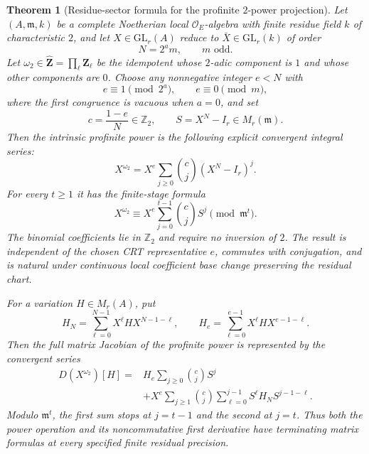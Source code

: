 \documentclass[11pt]{article}
\newtheorem{theorem}{Theorem}[section]
\theoremstyle{definition}
\begin{document}
\begin{theorem}[Residue-sector formula for the profinite $2$-power projection]
\label{thm:dyadic-omega2-power-formula}
Let $(A,\mathfrak m,k)$ be a complete Noetherian
local $\mathcal O_E$-algebra with finite residue
field $k$ of characteristic $2$, and let
$X\in\mathrm{GL}_r(A)$ reduce to
$\bar X\in\mathrm{GL}_r(k)$ of order
\[
 N=2^a m,\qquad m\text{ odd}.
\]
Let
$\omega_2\in\widehat{\mathbf Z}
=\prod_\ell\mathbf Z_\ell$ be the idempotent
whose $2$-adic component is $1$ and whose
other components are $0$.
Choose any nonnegative integer $e<N$ with
\begin{equation}\label{eq:dyadic-omega2-CRT}
 e\equiv1\pmod{2^a},\qquad
 e\equiv0\pmod m,
\end{equation}
where the first congruence is vacuous when $a=0$,
and set
\[
 c=\frac{1-e}{N}\in\mathbb Z_2,
 \qquad S=X^N-I_r\in M_r(\mathfrak m).
\]
Then the intrinsic profinite power is the
following explicit convergent integral series:
\begin{equation}\label{eq:dyadic-omega2-binomial-power}
 \boxed{\quad
 X^{\omega_2}
 =X^e\sum_{j\ge0}
   \binom cj (X^N-I_r)^j.
 \quad}
\end{equation}
For every $t\ge1$ it has the finite-stage formula
\begin{equation}\label{eq:dyadic-omega2-mod-t}
 X^{\omega_2}\equiv
 X^e\sum_{j=0}^{t-1}\binom cj S^j
 \pmod{\mathfrak m^t}.
\end{equation}
The binomial coefficients lie in $\mathbb Z_2$
and require no inversion of $2$.
The result is independent of the chosen
CRT representative $e$, commutes with
conjugation, and is natural under continuous
local coefficient base change preserving the
residual chart.

For a variation $H\in M_r(A)$, put
\begin{equation}\label{eq:dyadic-omega2-power-derivative}
 H_N=\sum_{\ell=0}^{N-1}
  X^\ell H X^{N-1-\ell},\qquad
 H_e=\sum_{\ell=0}^{e-1}
  X^\ell H X^{e-1-\ell}.
\end{equation}
Then the full matrix Jacobian of the profinite
power is represented by the convergent series
\begin{equation}\label{eq:dyadic-omega2-jacobian}
\begin{aligned}
 D(X^{\omega_2})[H]
 ={}&
 H_e\sum_{j\ge0}\binom cj S^j\\
 &+
 X^e\sum_{j\ge1}\binom cj
 \sum_{\ell=0}^{j-1}
  S^\ell H_N S^{j-1-\ell}.
\end{aligned}
\end{equation}
Modulo $\mathfrak m^t$, the first sum
stops at $j=t-1$ and the second at $j=t$.
Thus both the power operation and its
noncommutative first derivative have
terminating matrix formulas at every
specified finite residual precision.
\end{theorem}
\end{document}
